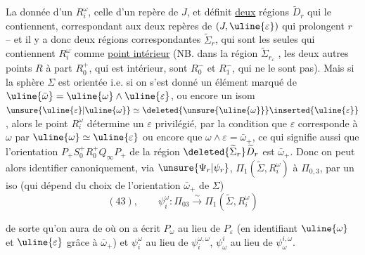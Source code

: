 La donnée d'un $R_i^\omega$,  celle d'un repère  de $J$, et définit \uline{deux}  régions $\widetilde D_r$ qui le contiennent, correspondant aux deux repères de $(J,\uline{\varepsilon})$ qui prolongent $r$ -- et il y a donc deux régions correspondantes $\widetilde\Sigma_r$, qui sont les seules qui contiennent $R_i^\omega$ comme \uline{point intérieur} (NB. dans la région $\widetilde\Sigma_{r_\varepsilon}$ , les deux autres points $R$ à part $R_0^+$, qui est intérieur, sont $R_0^-$ et $R_1^-$, qui ne le sont pas). Mais si la sphère $\Sigma$ est orientée i.e. si on s'est donné un élément marqué \inserted{$\bar\omega_+$} de $\uline{\bar\omega}=\uline{\omega}\wedge\uline{\varepsilon}$, ou encore un isom $\unsure{\uline{\varepsilon}|\uline{\omega}}\simeq\deleted{\unsure{\uline{\omega}}}\inserted{\uline{\varepsilon}}$, alors le point $R_i^\omega$ détermine un $\varepsilon$ \inserted{$\in\uline{\varepsilon}$} privilégié, par la condition que $\varepsilon$ corresponde à $\omega$ par $\uline{\omega}\simeq\uline{\varepsilon}$ ou encore que $\omega\wedge\varepsilon=\bar\omega_+$, ce qui signifie aussi que l'orientation $P_+S_0^+R_0^+Q_\infty P_+$ de la région $\deleted{\widetilde\Sigma_r}\widetilde D_r$ est  $\bar\omega_+$. Donc on peut alors identifier canoniquement, via $\unsure{\Psi_r|\psi_r}$, $\Pi_1(\widetilde\Sigma,R_i^\omega)$ à $\Pi_{0,3}$, par un iso (qui dépend du choix de l'orientation $\bar\omega_+$ de $\Sigma$)
\[
(43),\qquad\psi_i^\omega:\Pi_{03}\xrightarrow{\sim}\Pi_1(\widetilde\Sigma,R_i^\omega)
\]

de sorte qu'on aura   de
où on a écrit $P_\omega$ au lieu de $P_\varepsilon$ (en identifiant $\uline{\omega}$ et $\uline{\varepsilon}$ grâce à $\bar\omega_+$) et $\psi_i^\omega$ au lieu de $\psi_i^{\omega,\omega}$, $\psi_\omega^i$ au lieu de $\psi_\omega^{i,\omega}$.

